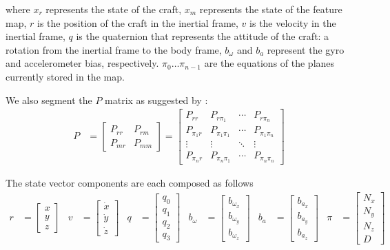 \documentclass[]{article}
\begin{document}
{where $x_r$ represents the state of the craft, $x_m$ represents the state of the feature map, $r$ is the position of the craft in the inertial frame, $v$ is the velocity in the inertial frame, $q$ is the quaternion that represents the attitude of the craft: a rotation from the inertial frame to the body frame, $b_\omega$ and $b_a$ represent the gyro and accelerometer bias, respectively. $\pi_0 \hdots \pi_{n-1}$ are the equations of the planes currently stored in the map.

We also segment the $P$ matrix as suggested by \cite{Sola2013}:
\begin{align}
	P &=
	\left[
	\begin{matrix}
		P_{rr} 	& P_{rm} \\
		P_{mr} 	& P_{mm}
	\end{matrix}
	\right]
	=
	\left[
	\begin{matrix}
		P_{rr} 		& P_{r \pi_1} 		& \cdots 	& P_{r \pi_n} \\
		P_{\pi_1 r} & P_{\pi_1 \pi_1}	& \cdots 	& P_{\pi_1 \pi_n} \\
		\vdots		& \vdots 			& \ddots 	& \vdots \\
		P_{\pi_n r} & P_{\pi_n \pi_1} 	& \cdots 	& P_{\pi_n \pi_n}
	\end{matrix}
	\right]
	\label{eqn:Pparts}
\end{align}

The state vector components are each composed as follows
\begin{align}
	r &= 
	\left[
	\begin{matrix}
		x \\
		y \\
		z
	\end{matrix}
	\right]
	&
	v &=
	\left[
	\begin{matrix}
		\dot{x} \\
		\dot{y} \\
		\dot{z}
	\end{matrix}
	\right]
	&
	q &=
	\left[
	\begin{matrix}
		q_0 \\
		q_1 \\
		q_2 \\
		q_3
	\end{matrix}
	\right]
	&
	b_\omega &=
	\left[
	\begin{matrix}
		b_{\omega_x} \\
		b_{\omega_y} \\
		b_{\omega_z} 
	\end{matrix}
	\right]
	&
	b_a &=
	\left[
	\begin{matrix}
		b_{a_x} \\
		b_{a_y} \\
		b_{a_z} 
	\end{matrix}
	\right]
	&
	\pi &=
	\left[
	\begin{matrix}
		N_x \\
		N_y \\
		N_z \\
		D
	\end{matrix}
	\right]
\end{align}

}
\end{document}
